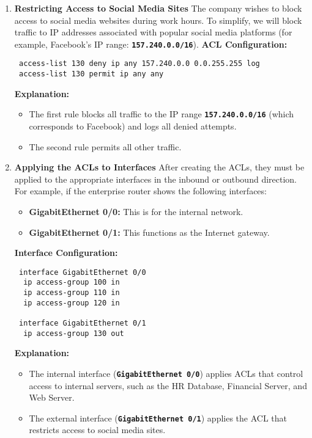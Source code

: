 \documentclass[11pt,a4paper]{article}
\begin{document}
\begin{enumerate}
                \item \textbf{Restricting Access to Social Media Sites}
                \newline
                The company wishes to block access to social media websites during work hours. To simplify, we will block traffic to IP addresses associated with popular social media platforms (for example, Facebook’s IP range: \textbf{\lstinline{157.240.0.0/16}}).
                \textbf{ACL Configuration:}
\begin{lstlisting}
 access-list 130 deny ip any 157.240.0.0 0.0.255.255 log
 access-list 130 permit ip any any                    
\end{lstlisting}
                \textbf{Explanation:}
                    \begin{itemize}
                        \item The first rule blocks all traffic to the IP range \textbf{\lstinline{157.240.0.0/16}} (which corresponds to Facebook) and logs all denied attempts.
                        \item The second rule permits all other traffic.
                \end{itemize}
                
            \item \textbf{Applying the ACLs to Interfaces}
            \newline
            After creating the ACLs, they must be applied to the appropriate interfaces in the inbound or outbound direction. For example, if the enterprise router shows the following interfaces:
                \begin{itemize}
                    \item \textbf{GigabitEthernet 0/0:} This is for the internal network.
                    \item \textbf{GigabitEthernet 0/1:} This functions as the Internet gateway.
                \end{itemize}

            \textbf{Interface Configuration:}
\begin{lstlisting}
 interface GigabitEthernet 0/0
  ip access-group 100 in
  ip access-group 110 in
  ip access-group 120 in

 interface GigabitEthernet 0/1
  ip access-group 130 out   
\end{lstlisting}

            \textbf{Explanation:}
                    \begin{itemize}
                        \item The internal interface (\textbf{\lstinline{GigabitEthernet 0/0}}) applies ACLs that control access to internal servers, such as the HR Database, Financial Server, and Web Server.
                        \item The external interface (\textbf{\lstinline{GigabitEthernet 0/1}}) applies the ACL that restricts access to social media sites.
                    \end{itemize}
            \end{enumerate}
\end{document}
